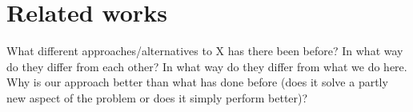 \section{Related works}

What different approaches/alternatives to X has there been before? In what way do they differ from each other? In what way do they differ from what we do here. Why is our approach better than what has done before (does it solve a partly new aspect of the problem or does it simply perform better)?

